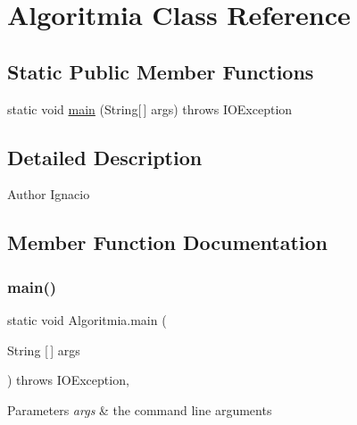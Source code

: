 \hypertarget{class_algoritmia}{}\section{Algoritmia Class Reference}
\label{class_algoritmia}
\subsection*{Static Public Member Functions}
\begin{DoxyCompactItemize}
\item 
static void \mbox{\hyperlink{class_algoritmia_ac21270cbe06fb5ff83017348f9a8c81f}{main}} (String\mbox{[}$\,$\mbox{]} args)  throws I\+O\+Exception 
\end{DoxyCompactItemize}


\subsection{Detailed Description}
\begin{DoxyAuthor}{Author}
Ignacio 
\end{DoxyAuthor}


\subsection{Member Function Documentation}
\mbox{\label{class_algoritmia_ac21270cbe06fb5ff83017348f9a8c81f}} 
\subsubsection{\texorpdfstring{main()}{main()}}
{\footnotesize\ttfamily static void Algoritmia.\+main (\begin{DoxyParamCaption}\item[{String \mbox{[}$\,$\mbox{]}}]{args }\end{DoxyParamCaption}) throws I\+O\+Exception\hspace{0.3cm}{\ttfamily [inline]}, {\ttfamily [static]}}


\begin{DoxyParams}{Parameters}
{\em args} & the command line arguments \\
\hline
\end{DoxyParams}

